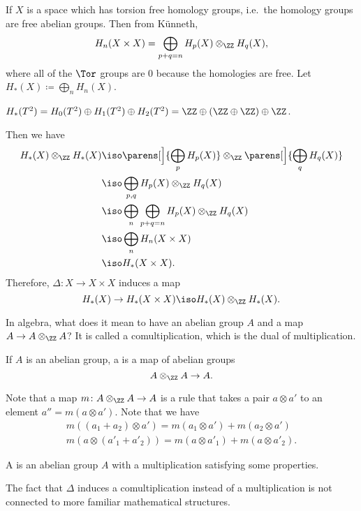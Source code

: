 \documentclass{standalone}
\begin{document}
If \(X\) is a space which has torsion free homology groups,
i.e.\ the homology groups are free abelian groups.
Then from K\"unneth,
\[
  H_n(X \times X) = \bigoplus_{p + q = n} H_p(X) \otimes_\ZZ H_q(X),
\]
where all of the \(\Tor\) groups are \(0\) because the homologies are free.
Let \(H_*(X) \coloneqq \bigoplus_n H_n(X)\).

\begin{example}
  \(H_*(T^2) = H_0(T^2) \oplus H_1(T^2) \oplus H_2(T^2)
             = \ZZ \oplus (\ZZ \oplus \ZZ) \oplus \ZZ\).
\end{example}

Then we have
\begin{align*}
  H_*(X) \otimes_\ZZ H_*(X)
    &\iso \parens[\Big]{\bigoplus_p H_p(X)} \otimes_\ZZ
          \parens[\Big]{\bigoplus_q H_q(X)} \\
    &\iso \bigoplus_{p, q} H_p(X) \otimes_\ZZ H_q(X) \\
    &\iso \bigoplus_n \bigoplus_{p + q = n} H_p(X) \otimes_\ZZ H_q(X) \\
    &\iso \bigoplus_n H_n(X \times X) \\
    &\iso H_*(X \times X).
\end{align*}
Therefore, \(\Delta \colon X \to X \times X\) induces a map
\[
  H_*(X) \to H_*(X \times X) \iso H_*(X) \otimes_\ZZ H_*(X).
\]

\begin{question}
  In algebra, what does it mean to have an abelian group \(A\)
  and a map \(A \to A \otimes_\ZZ A\)?
  \tcblower
  It is called a comultiplication, which is the dual of multiplication.
\end{question}

\begin{definition}
  If \(A\) is an abelian group, a 
  is a map of abelian groups
  \[
    A \otimes_\ZZ A \to A.
  \]
\end{definition}

Note that a map \(m \colon A \otimes_\ZZ A \to A\) is a rule
that takes a pair \(a \otimes a'\) to an element \(a'' = m(a \otimes a')\).
Note that we have
\begin{gather*}
  m((a_1 + a_2) \otimes a') = m(a_1 \otimes a') + m(a_2 \otimes a') \\
  m(a \otimes (a'_1 + a'_2)) = m(a \otimes a'_1) + m(a \otimes a'_2).
\end{gather*}

\begin{example}
  A  is an abelian group \(A\) with a multiplication satisfying
  some properties.
\end{example}

The fact that \(\Delta\) induces a comultiplication instead of a multiplication
is not connected to more familiar mathematical structures.
\end{document}
